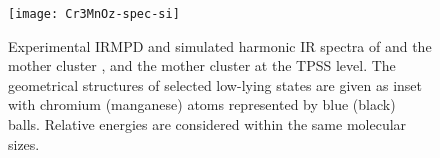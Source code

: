 \begin{figure}
	\centering
	\texttt{[image: Cr3MnOz-spec-si]}
	\caption{Experimental IRMPD and simulated harmonic IR spectra of  and the mother cluster , and the mother cluster  at the TPSS level. The geometrical structures of selected low-lying states are given as inset with chromium (manganese) atoms represented by blue (black) balls. Relative energies are considered within the same molecular sizes.}
	\label{figs:Cr3MnOz-spec-si}
\end{figure}

\FloatBarrier



